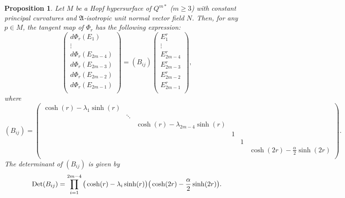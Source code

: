 \documentclass[reqno]{amsart}%
\newtheorem{proposition}[theorem]{Proposition}
\theoremstyle{definition}
\numberwithin{equation}{section}
\begin{document}
\begin{proposition}\label{prop:4.1w}
Let $M$ be a Hopf hypersurface of $Q^{m*}$ ($m\geq3$) with constant principal curvatures and $\mathfrak{A}$-isotropic unit normal vector field $N$.
Then, for any $p\in M$, the tangent map of $\Phi_r$ has the following expression:
\begin{equation}\label{eqn:rank}
\left(
  \begin{array}{c}
    d\Phi_r(E_1) \\
    \vdots \\
    d\Phi_r(E_{2m-4}) \\
    d\Phi_r(E_{2m-3}) \\
    d\Phi_r(E_{2m-2}) \\
    d\Phi_r(E_{2m-1}) \\
  \end{array}
\right)=(B_{ij})
\left(
  \begin{array}{c}
    E_1^r \\
    \vdots \\
    E^r_{2m-4} \\
    E^r_{2m-3} \\
    E^r_{2m-2} \\
    E^r_{2m-1} \\
  \end{array}
\right),
\end{equation}
where
\begin{equation}\label{Bij111}
(B_{ij})=
\left(
\begin{array}{cccccc}
\cosh(r)-\lambda_1\sinh(r) & & & & & \\
 & \ddots & & & & \\
 & & \cosh(r)-\lambda_{2m-4}\sinh(r) & & & \\
  & &  & 1 & & \\
   & &  & & 1  & \\
    & &  & & & \cosh(2r)-\frac{\alpha}{2}\sinh(2r) \\
\end{array}
\right).
\end{equation}
The determinant of $(B_{ij})$ is given by
\begin{equation}\label{eqn:det}
{\rm Det}(B_{ij})=\prod_{i=1}^{2m-4}\big(\cosh(r)-\lambda_i\sinh(r)\big)
\big(\cosh(2r)-\frac{\alpha}{2}\sinh(2r)\big).
\end{equation}


\end{proposition}
\end{document}
